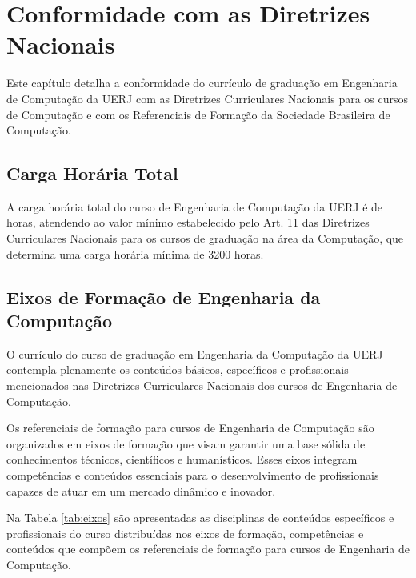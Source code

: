 \chapter{Conformidade com as Diretrizes Nacionais}

Este capítulo detalha a conformidade do currículo de graduação em Engenharia de Computação da UERJ com as Diretrizes Curriculares Nacionais para os cursos de Computação e com os  Referenciais de Formação da Sociedade Brasileira de Computação.


\section{Carga Horária Total}

A carga horária total do curso de Engenharia de Computação da UERJ é de \tHorasCurso horas, atendendo ao valor mínimo estabelecido pelo Art. 11 das Diretrizes Curriculares Nacionais para os cursos de graduação na área da Computação, que determina uma carga horária mínima de 3200 horas.


\section{Eixos de Formação de Engenharia da Computação}

O currículo do curso de graduação em Engenharia da Computação da UERJ contempla plenamente os conteúdos básicos, específicos e profissionais mencionados nas Diretrizes Curriculares Nacionais dos cursos de Engenharia de Computação.

Os referenciais de formação para cursos de Engenharia de Computação são organizados em eixos de formação que visam garantir uma base sólida de conhecimentos técnicos, científicos e humanísticos. Esses eixos integram competências e conteúdos essenciais para o desenvolvimento de profissionais capazes de atuar em um mercado dinâmico e inovador.

Na Tabela \ref{tab:eixos} são apresentadas as disciplinas de conteúdos específicos e profissionais do curso distribuídas nos eixos de formação, competências e conteúdos que compõem os referenciais de formação para cursos de Engenharia de Computação.



